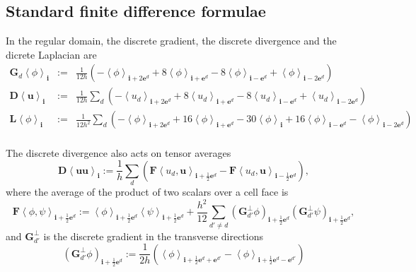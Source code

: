 \subsection{Standard finite difference formulae}
\label{sec:Standard}

In the regular domain, the discrete gradient, the discrete divergence and the dicrete
Laplacian are
\begin{eqnarray}
  \label{eq:G}
  \mathbf{G}_d\left<\phi\right>_{\mathbf{i}} &:=&
  \frac{1}{12h}\left(-\left<\phi\right>_{\mathbf{i}+2\mathbf{e}^d}
    +8\left<\phi\right>_{\mathbf{i}+\mathbf{e}^d}
    -8\left<\phi\right>_{\mathbf{i}-\mathbf{e}^d} 
  +\left<\phi\right>_{\mathbf{i}-2\mathbf{e}^d}\right) \\
  \label{eq:D}
  \mathbf{D}\left<\mathbf{u}\right>_{\mathbf{i}} &:=&
  \frac{1}{12h}\sum\limits_d \left( -\left<u_d\right>_{\mathbf{i}+2\mathbf{e}^d}
    +8\left<u_d\right>_{\mathbf{i}+\mathbf{e}^d}
    -8\left<u_d\right>_{\mathbf{i}-\mathbf{e}^d} 
                                                      +\left<u_d\right>_{\mathbf{i}-2\mathbf{e}^d}\right) \\
  \label{eq:L}
  \mathbf{L}\left<\phi\right>_{\mathbf{i}} &:=&
  \frac{1}{12h^2}\sum\limits_d\left(-\left<\phi\right>_{\mathbf{i}+2\mathbf{e}^d}
    +16\left<\phi\right>_{\mathbf{i}+\mathbf{e}^d} - 30\left<\phi\right>_{\mathbf{i}} 
    +16\left<\phi\right>_{\mathbf{i}-\mathbf{e}^d} 
  -\left<\phi\right>_{\mathbf{i}-2\mathbf{e}^d}\right) \\
\end{eqnarray}

The discrete divergence also acts on tensor averages
\begin{equation}
  \label{eq:Duu}
  \mathbf{D}\left<\mathbf{uu}\right>_{\mathbf{i}} :=
  \frac{1}{h}\sum\limits_d\left(
    \mathbf{F}\left<u_d,\mathbf{u}\right>_{\mathbf{i}+\frac{1}{2}\mathbf{e}^d}
    -
    \mathbf{F}\left<u_d,\mathbf{u}\right>_{\mathbf{i}-\frac{1}{2}\mathbf{e}^d}  \right),
\end{equation}
where the average of the product of two scalars over a cell face is
\begin{equation}
  \label{eq:ProductOf2scalar}
  \mathbf{F}\left<\phi,\psi\right>_{\mathbf{i}+\frac{1}{2}\mathbf{e}^d}
  :=
  \left<\phi\right>_{\mathbf{i}+\frac{1}{2}\mathbf{e}^d}
  \left<\psi\right>_{\mathbf{i}+\frac{1}{2}\mathbf{e}^d}+
  \frac{h^2}{12}\sum\limits_{d'\neq
    d}\left(\mathbf{G}^{\perp}_{d'}\phi\right)_{\mathbf{i}+\frac{1}{2}\mathbf{e}^d}
  \left(\mathbf{G}^{\perp}_{d'}\psi\right)_{\mathbf{i}+\frac{1}{2}\mathbf{e}^d},
\end{equation}
and $\mathbf{G}^{\perp}_{d'}$ is the discrete gradient in the
transverse directions
\begin{equation}
  \label{eq:TransverseG}
  \left(\mathbf{G}^{\perp}_{d'}\phi\right)_{\mathbf{i}+\frac{1}{2}\mathbf{e}^d}
  :=
  \frac{1}{2h}\left(\left<\phi\right>_{\mathbf{i}+\frac{1}{2}\mathbf{e}^d+\mathbf{e}^{d'}}-
  \left<\phi\right>_{\mathbf{i}+\frac{1}{2}\mathbf{e}^d-\mathbf{e}^{d'}}
 \right)
\end{equation}

